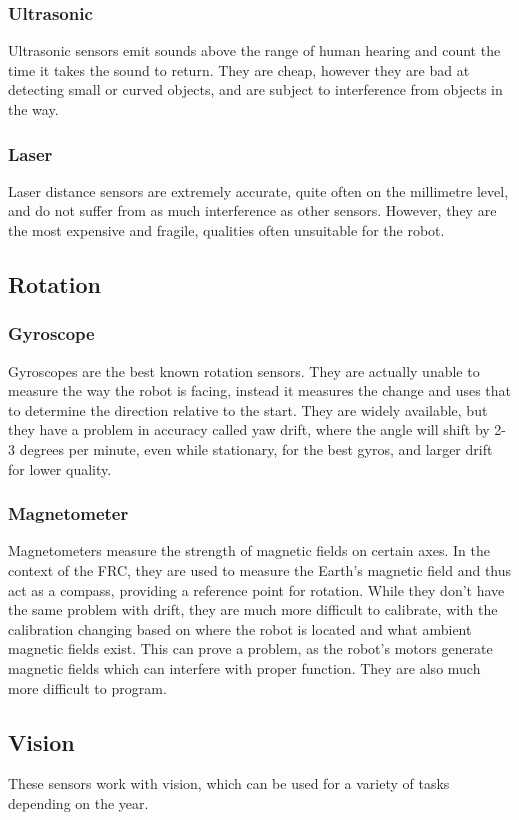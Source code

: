 \documentclass[]{report}
\begin{document}
	\subsubsection{Ultrasonic}
		Ultrasonic sensors emit sounds above the range of human hearing and count the time it takes the sound to return.
		They are cheap, however they are bad at detecting small or curved objects, and are subject to interference from objects in the way.
	\subsubsection{Laser}
		Laser distance sensors are extremely accurate, quite often on the millimetre level, and do not suffer from as much interference as other sensors. However, they are the most expensive and fragile, qualities often unsuitable for the robot.
\subsection{Rotation}
	\subsubsection{Gyroscope}
		Gyroscopes are the best known rotation sensors.
		They are actually unable to measure the way the robot is facing, instead it measures the change and uses that to determine the direction relative to the start.
		They are widely available, but they have a problem in accuracy called yaw drift, where the angle will shift by 2-3 degrees per minute, even while stationary, for the best gyros, and larger drift for lower quality.
\subsubsection{Magnetometer}
		Magnetometers measure the strength of magnetic fields on certain axes.
		In the context of the FRC, they are used to measure the Earth's magnetic field and thus act as a compass, providing a reference point for rotation.
		While they don't have the same problem with drift, they are much more difficult to calibrate, with the calibration changing based on where the robot is located and what ambient magnetic fields exist.
		This can prove a problem, as the robot's motors generate magnetic fields which can interfere with proper function.
		They are also much more difficult to program.
\subsection{Vision}
	These sensors work with vision, which can be used for a variety of tasks depending on the year.
\end{document}
